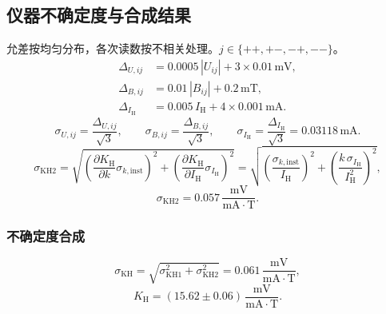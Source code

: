 \documentclass[UTF8,a4paper,zihao=-4,fontset=fandol]{ctexart}
\begin{document}
\subsection*{仪器不确定度与合成结果}
\noindent 允差按均匀分布，各次读数按不相关处理。$j\in\{++,+-,-+,--\}$。
\[
\begin{aligned}
\Delta_{U,ij}&=0.0005\,|U_{ij}|+3\times0.01\,\mathrm{mV},\\
\Delta_{B,ij}&=0.01\,|B_{ij}|+0.2\,\mathrm{mT},\\
\Delta_{I_{\mathrm H}}&=0.005\,I_{\mathrm H}+4\times0.001\,\mathrm{mA}.
\end{aligned}
\]
\[
\sigma_{U,ij}=\frac{\Delta_{U,ij}}{\sqrt3},\qquad
\sigma_{B,ij}=\frac{\Delta_{B,ij}}{\sqrt3},\qquad
\sigma_{I_{\mathrm H}}=\frac{\Delta_{I_{\mathrm H}}}{\sqrt3}=0.03118\,\mathrm{mA}.
\]
\[
\sigma_{\mathrm{KH2}}=
\sqrt{\left(\frac{\partial K_{\mathrm H}}{\partial k}\sigma_{k,\mathrm{inst}}\right)^2
+\left(\frac{\partial K_{\mathrm H}}{\partial I_{\mathrm H}}\sigma_{I_{\mathrm H}}\right)^2}
=\sqrt{\left(\frac{\sigma_{k,\mathrm{inst}}}{I_{\mathrm H}}\right)^2
+\left(\frac{k\,\sigma_{I_{\mathrm H}}}{I_{\mathrm H}^2}\right)^2},
\]
\[
\boxed{\sigma_{\mathrm{KH2}}=0.057\,\frac{\mathrm{mV}}{\mathrm{mA}\cdot\mathrm T}}.
\]
\subsubsection*{不确定度合成}
\[
\sigma_{\mathrm{KH}}=\sqrt{\sigma_{\mathrm{KH1}}^2+\sigma_{\mathrm{KH2}}^2}
=0.061\,\frac{\mathrm{mV}}{\mathrm{mA}\cdot\mathrm T},
\]
\[
\boxed{K_{\mathrm H}=(15.62\pm0.06)\,\frac{\mathrm{mV}}{\mathrm{mA}\cdot\mathrm T}}.
\]
\end{document}
